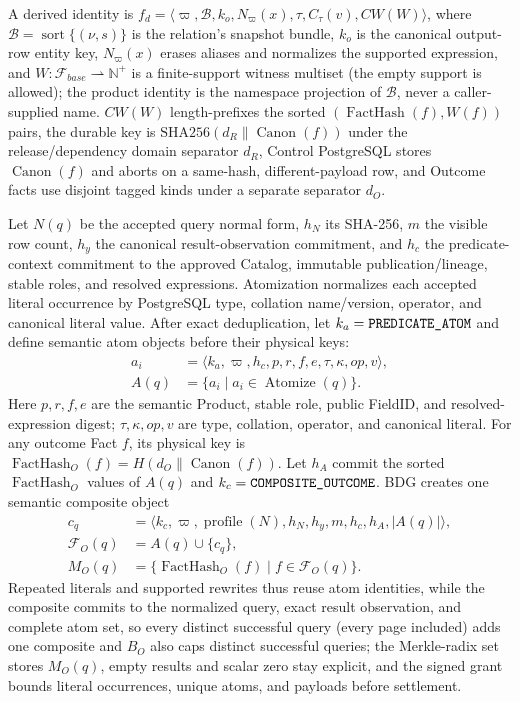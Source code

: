 \documentclass[10pt,journal,compsoc]{IEEEtran}
\newcommand{\code}[1]{\texttt{\detokenize{#1}}}
\newcommand{\facts}{\mathcal{F}}
\begin{document}
A derived identity is
$f_d=\langle\varpi,\mathcal B,k_o,N_\varpi(x),\tau,C_\tau(v),CW(W)\rangle$,
where $\mathcal B=\operatorname{sort}\{(\nu,s)\}$ is the relation's snapshot
bundle, $k_o$ is the canonical output-row entity key, $N_\varpi(x)$ erases aliases
and normalizes the supported expression, and
$W:\facts_{base}\rightharpoonup\mathbb N^+$
is a finite-support witness multiset (the empty support is allowed); the
product identity is the namespace projection of $\mathcal B$, never a
caller-supplied name. $CW(W)$ length-prefixes the sorted
$(\operatorname{FactHash}(f),W(f))$ pairs, the durable key is
$\mathrm{SHA256}(d_R\|\operatorname{Canon}(f))$ under the release/dependency
domain separator $d_R$, Control PostgreSQL stores $\operatorname{Canon}(f)$
and aborts on a same-hash, different-payload row, and Outcome facts use
disjoint tagged kinds under a separate separator $d_O$.

Let $N(q)$ be the accepted query normal form, $h_N$ its SHA-256, $m$ the
visible row count, $h_y$ the canonical result-observation commitment, and
$h_c$ the predicate-context commitment to the approved Catalog, immutable
publication/lineage, stable roles, and resolved expressions. Atomization
normalizes each accepted literal occurrence by PostgreSQL type, collation
name/version, operator, and canonical literal value. After exact
deduplication, let $k_a=\code{PREDICATE_ATOM}$ and define semantic atom
objects before their physical keys:
\begin{equation}
 \begin{aligned}
 a_i&=\langle k_a,\varpi,h_c,p,r,f,e,\tau,\kappa,op,v\rangle,\\
 A(q)&=\{a_i\mid a_i\in\operatorname{Atomize}(q)\}.
 \end{aligned}
 \label{eq:predicate-atoms}
\end{equation}
Here $p,r,f,e$ are the semantic Product, stable role, public FieldID, and resolved-expression
digest; $\tau,\kappa,op,v$ are type, collation, operator, and canonical
literal. For any outcome Fact $f$, its physical key is
$\operatorname{FactHash}_O(f)=H(d_O\|\operatorname{Canon}(f))$.
Let $h_A$ commit the sorted $\operatorname{FactHash}_O$ values of $A(q)$ and
$k_c=\code{COMPOSITE_OUTCOME}$. BDG creates one semantic composite object
\begin{equation}
 \begin{aligned}
 c_q&=\langle k_c,\varpi,\operatorname{profile}(N),h_N,h_y,m,h_c,h_A,|A(q)|\rangle,\\
 \facts_O(q)&=A(q)\cup\{c_q\},\\
 M_O(q)&=\{\operatorname{FactHash}_O(f)\mid f\in\facts_O(q)\}.
 \end{aligned}
 \label{eq:outcome-fact}
\end{equation}
Repeated literals and supported rewrites thus reuse atom identities, while
the composite commits to the normalized query, exact result observation,
and complete atom set, so every distinct successful query (every page
included) adds one composite and $B_O$ also caps distinct successful
queries; the Merkle-radix set stores $M_O(q)$, empty results and scalar
zero stay explicit, and the signed grant bounds literal occurrences, unique
atoms, and payloads before settlement.
\end{document}
